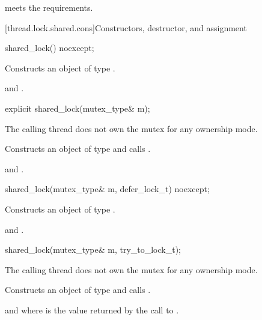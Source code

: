 \pnum
\begin{note}
 meets the 
requirements.
\end{note}

[thread.lock.shared.cons]{Constructors, destructor, and assignment}

%
\begin{itemdecl}
shared_lock() noexcept;
\end{itemdecl}

\begin{itemdescr}
\pnum
\effects
Constructs an object of type .

\pnum
\ensures
{} and .
\end{itemdescr}

%
\begin{itemdecl}
explicit shared_lock(mutex_type& m);
\end{itemdecl}

\begin{itemdescr}
\pnum
\requires The calling thread does not own the mutex for any ownership mode.

\pnum
\effects
Constructs an object of type  and calls .

\pnum
\ensures
{} and .
\end{itemdescr}

%
\begin{itemdecl}
shared_lock(mutex_type& m, defer_lock_t) noexcept;
\end{itemdecl}

\begin{itemdescr}
\pnum
\effects
Constructs an object of type .

\pnum
\ensures
{} and .
\end{itemdescr}

%
\begin{itemdecl}
shared_lock(mutex_type& m, try_to_lock_t);
\end{itemdecl}

\begin{itemdescr}
\pnum
\requires The calling thread does not own the mutex for any ownership mode.

\pnum
\effects
Constructs an object of type  and calls .

\pnum
\ensures
{} and 
where  is the
value returned by the call to .
\end{itemdescr}

